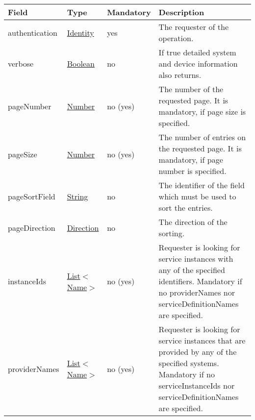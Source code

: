 \documentclass[a4paper]{arrowhead}
\newcommand{\pref}[1]{{\textcolor{ArrowheadGrey}{\hyperref[sec:model:primitives:#1]{#1}}}}
\begin{document}
\begin{table}[ht!]
\begin{tabularx}{\textwidth}{| p{5.3cm} | p{4.8cm} | p{2cm} | X |} \hline
\rowcolor{gray!33} Field & Type & Mandatory & Description \\ \hline
authentication & \hyperref[sec:model:Identity]{Identity} & yes & The requester of the ope\-ration. \\ \hline
verbose & \pref{Boolean} & no & If true detailed system and device information also returns. \\ \hline
pageNumber & \pref{Number} & no (yes) & The number of the requested page. It is mandatory, if page size is specified. \\ \hline
pageSize & \pref{Number} & no (yes) & The number of entries on the requested page. It is mandatory, if page number is specified. \\ \hline
pageSortField & \pref{String} & no & The identifier of the field which must be used to sort the entries. \\ \hline
pageDirection & \pref{Direction} & no & The direction of the sorting. \\ \hline
instanceIds &  \pref{List}$<$\pref{Name}$>$ & no (yes) & Requester is looking for service instances with any of the spe\-cified identifiers. Mandatory if no providerNames nor serviceDefinitionNames are spe\-cified. \\ \hline
providerNames &  \pref{List}$<$\pref{Name}$>$ & no (yes) & Requester is looking for service ins\-tances that are provided by any of the specified systems. Mandatory if no serviceInstanceIds nor serviceDefinitionNames are spe\-cified. \\ \hline
\end{tabularx}
\end{table}

\clearpage
\end{document}
